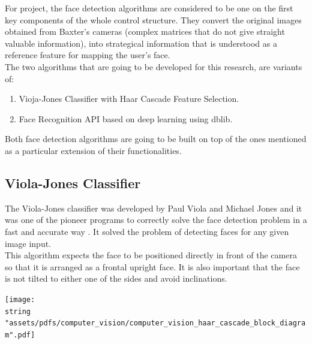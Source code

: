 \documentclass[11pt]{report} %
\begin{document}
For  project, the face detection algorithms are considered to be one on the first key components of the whole control structure. They convert the original images obtained from Baxter's cameras (complex matrices that do not give straight valuable information), into strategical information that is understood as a reference feature for mapping the user's face.\\

The two algorithms that are going to be developed for this research, are variants of:

\begin{enumerate}
    \item Vioja-Jones Classifier with Haar Cascade Feature Selection.
    \item Face Recognition API based on deep learning using dblib.
\end{enumerate}

Both face detection algorithms are going to be built on top of the ones mentioned as a particular extension of their functionalities.\\

\subsection{Viola-Jones Classifier}
\label{sec:viola_jones_classifier}

The Viola-Jones classifier was developed by Paul Viola and Michael Jones and it was one of the pioneer programs to correctly solve the face detection problem in a fast and accurate way \citep{cite_viola_jones_face_detection_algorithm}. It solved the problem of detecting faces for any given image input.\\

This algorithm expects the face to be positioned directly in front of the camera so that it is arranged as a frontal upright face. It is also important that the face is not tilted to either one of the sides and avoid inclinations.\\

\begin{center}
\texttt{[image: \\string "assets/pdfs/computer\_vision/computer\_vision\_haar\_cascade\_block\_diagram".pdf]}
\bigbreak
\begin{minipage}{\linewidth} %
\label{fig_computer_vision_block_diagram_haar_cascade}
\end{minipage} \end{center}
\end{document}

